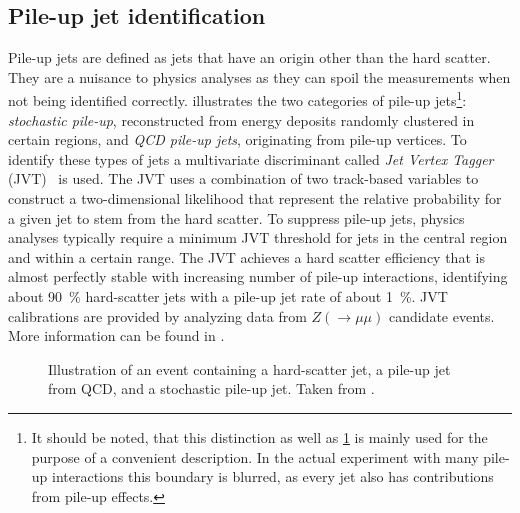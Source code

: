 \subsection{Pile-up jet identification}
Pile-up jets are defined as jets that have an origin other than the hard scatter. They are a nuisance to physics analyses as they can spoil the measurements when not being identified correctly. 
 illustrates the two categories of pile-up jets\footnote{It should be noted, that this distinction as well as \cref{fig:pile-up-jets-illustration} is mainly used for the purpose of a convenient description. In the actual experiment with many pile-up interactions this boundary is blurred, as every jet also has contributions from pile-up effects.}:
\emph{stochastic pile-up}, reconstructed from energy deposits randomly clustered in certain regions, and \emph{QCD pile-up jets}, originating from pile-up vertices.
To identify these types of jets a multivariate discriminant called \emph{Jet Vertex Tagger} (JVT)~\cite{ATLAS-CONF-2014-018} is used. 
The JVT uses a combination of two track-based variables to construct a two-dimensional likelihood that represent the relative probability for a given jet to stem from the hard scatter. 
To suppress pile-up jets, physics analyses typically require a minimum JVT threshold for jets in the central region  and within a certain \pT range.
The JVT achieves a hard scatter efficiency that is almost perfectly stable with increasing number of pile-up interactions, identifying about \SI{90}{\percent} hard-scatter jets with a pile-up jet rate of about \SI{1}{\percent}. 
JVT calibrations are provided by analyzing data from $Z (\rightarrow \mu\mu)$ candidate events. 
More information can be found in .



\begin{figure}
    \caption{Illustration of an event containing a hard-scatter jet, a pile-up jet from QCD, and a stochastic pile-up jet. Taken from .}
    \label{fig:pile-up-jets-illustration}
\end{figure}


